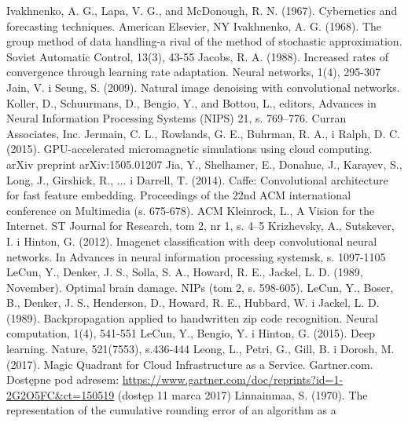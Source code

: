 \documentclass[12pt,a4paper,twoside]{article}
\begin{document}
\begin{thebibliography}{99}
 Ivakhnenko, A. G., Lapa, V. G., and McDonough, R. N. (1967). Cybernetics and forecasting techniques. American Elsevier, NY
 Ivakhnenko, A. G. (1968). The group method of data handling-a rival of the method of stochastic approximation. Soviet Automatic Control, 13(3), 43-55
 Jacobs, R. A. (1988). Increased rates of convergence through learning rate adaptation. Neural networks, 1(4), 295-307
 Jain, V. i Seung, S. (2009). Natural image denoising with convolutional networks. Koller, D., Schuurmans, D., Bengio, Y., and Bottou, L., editors, Advances in Neural Information Processing Systems (NIPS) 21, s. 769–776. Curran Associates, Inc.
 Jermain, C. L., Rowlands, G. E., Buhrman, R. A., i Ralph, D. C. (2015). GPU-accelerated micromagnetic simulations using cloud computing. arXiv preprint arXiv:1505.01207
 Jia, Y., Shelhamer, E., Donahue, J., Karayev, S., Long, J., Girshick, R., ... i Darrell, T. (2014). Caffe: Convolutional architecture for fast feature embedding. Proceedings of the 22nd ACM international conference on Multimedia (s. 675-678). ACM
 Kleinrock, L., A Vision for the Internet. ST Journal for Research, tom 2, nr 1, s. 4–5
 Krizhevsky, A., Sutskever, I. i Hinton, G. (2012). Imagenet classification with deep convolutional neural networks. In Advances in neural information processing systemsk, s. 1097-1105
 LeCun, Y., Denker, J. S., Solla, S. A., Howard, R. E., Jackel, L. D. (1989, November). Optimal brain damage. NIPs (tom 2, s. 598-605).
 LeCun, Y., Boser, B., Denker, J. S., Henderson, D., Howard, R. E., Hubbard, W. i Jackel, L. D. (1989). Backpropagation applied to handwritten zip code recognition. Neural computation, 1(4), 541-551
 LeCun, Y., Bengio, Y. i Hinton, G. (2015). Deep learning. Nature, 521(7553), s.436-444
 Leong, L., Petri, G., Gill, B. i Dorosh, M. (2017). Magic Quadrant for Cloud Infrastructure as a Service. Gartner.com. Dostępne pod adresem: \url{https://www.gartner.com/doc/reprints?id=1-2G2O5FC&ct=150519} (dostęp 11 marca 2017)
 Linnainmaa, S. (1970). The representation of the cumulative rounding error of an algorithm as a

\end{thebibliography}
\end{document}
